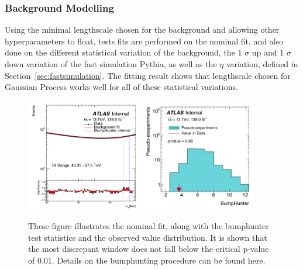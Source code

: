 \subsubsection{Background Modelling}
Using the minimal lengthscale chosen for the background and allowing other hyperparameters to float, tests fits are performed on the nominal fit, and also done on the different statistical variation of the background, the 1 $\sigma$ up and 1 $\sigma$ down variation of the fast simulation Pythia, as well as the $\eta$ variation, defined in Section~\ref{sec:fastsimulation}.
The fitting result shows that lengthscale chosen for Gaussian Process works well for all of these statistical variations. 

\begin{figure}[!htb]
    \begin{center}
        \includegraphics[width=0.45\textwidth]{figures/chapter_dimuon/Nominal}        
        \includegraphics[width=0.45\textwidth]{figures/chapter_dimuon/NominalBH}        
        \caption{
        These figure illustrates the nominal fit, along with the bumphunter test statistics and the observed value distribution. It is shown that the most discrepant window does not fall below the critical p-value of 0.01. Details on the bumphunting procedure can be found here. 
        }
        \label{fig:dimuonstudies}
    \end{center}
\end{figure}
\FloatBarrier



